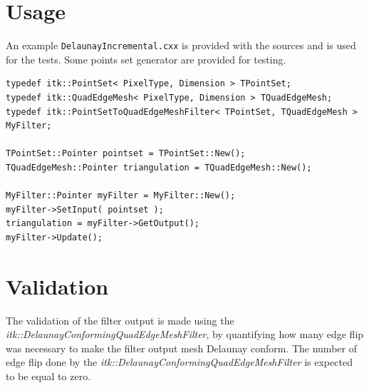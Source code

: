 \documentclass{InsightArticle}
\begin{document}
\section{Usage}

An example \texttt{DelaunayIncremental.cxx} is provided with the sources and is used for the tests. Some points set generator are provided for testing.

\begin{verbatim}
typedef itk::PointSet< PixelType, Dimension > TPointSet;
typedef itk::QuadEdgeMesh< PixelType, Dimension > TQuadEdgeMesh;
typedef itk::PointSetToQuadEdgeMeshFilter< TPointSet, TQuadEdgeMesh > MyFilter;

TPointSet::Pointer pointset = TPointSet::New();
TQuadEdgeMesh::Pointer triangulation = TQuadEdgeMesh::New();

MyFilter::Pointer myFilter = MyFilter::New();
myFilter->SetInput( pointset );
triangulation = myFilter->GetOutput();
myFilter->Update();
\end{verbatim}

\section{Validation}

The validation of the filter output is made using the \emph{itk::DelaunayConformingQuadEdgeMeshFilter}, by quantifying how many edge flip was necessary to make the filter output mesh Delaunay conform. The number of edge flip done by the \emph{itk::DelaunayConformingQuadEdgeMeshFilter} is expected to be equal to zero.
\end{document}

